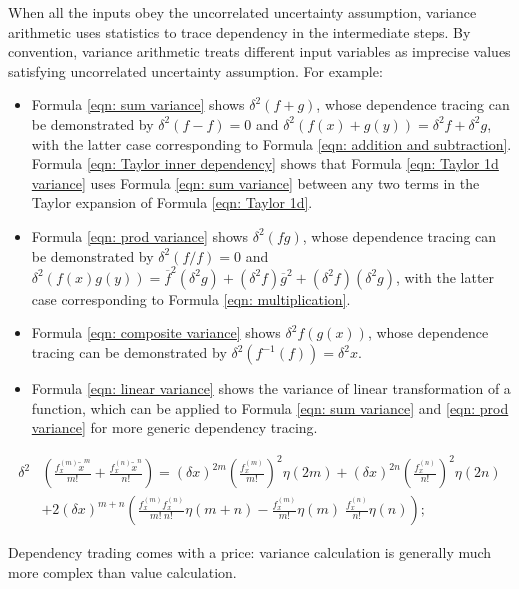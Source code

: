 \documentclass[twoside]{article}
\numberwithin{equation}{section}
\begin{document}
When all the inputs obey the uncorrelated uncertainty assumption, variance arithmetic uses statistics to trace dependency in the intermediate steps.
By convention, variance arithmetic treats different input variables as imprecise values satisfying uncorrelated uncertainty assumption.
For example:
\begin{itemize}
\item Formula \eqref{eqn: sum variance} shows $\delta^2 (f + g)$, whose dependence tracing can be demonstrated by $\delta^2 (f - f) = 0$  and $\delta^2 (f(x) + g(y)) = \delta^2 f + \delta^2 g$, with the latter case corresponding to Formula \eqref{eqn: addition and subtraction}.   Formula \eqref{eqn: Taylor inner dependency} shows that Formula \eqref{eqn: Taylor 1d variance} uses Formula \eqref{eqn: sum variance} between any two terms in the Taylor expansion of Formula \eqref{eqn: Taylor 1d}.

\item Formula \eqref{eqn: prod variance} shows  $\delta^2 (f g)$, whose dependence tracing can be demonstrated by $\delta^2 (f/f) = 0$  and $\delta^2 (f(x) g(y)) = \overline{f}^2 (\delta^2 g) + (\delta^2 f) \overline{g}^2 +  (\delta^2 f) (\delta^2 g)$, with the latter case corresponding to Formula \eqref{eqn: multiplication}.  

\item Formula \eqref{eqn: composite variance} shows  $\delta^2 f(g(x))$, whose dependence tracing can be demonstrated by $\delta^2 (f^{-1}(f)) = \delta^2 x$.  

\item Formula \eqref{eqn: linear variance} shows the variance of linear transformation of a function, which can be applied to Formula \eqref{eqn: sum variance} and \eqref{eqn: prod variance} for more generic dependency tracing.
\end{itemize}
\begin{align}
\label{eqn: Taylor inner dependency}
\delta^2 & \left( \frac{f^{(m)}_x \tilde{x}^m}{m!} + \frac{f^{(n)}_x \tilde{x}^n}{n!} \right) = 
    (\delta x)^{2m} (\frac{f^{(m)}_x }{m!})^2 \eta(2m) + (\delta x)^{2n} (\frac{f^{(n)}_x }{n!})^2 \eta(2n) \\
  &+ 2 (\delta x)^{m+n} \left( \frac{f^{(m)}_x f^{(n)}_x}{m! \;n!} \eta(m+n) 	- \frac{f^{(m)}_x}{m!} \eta(m) \;\frac{f^{(n)}_x}{n!}  \eta(n) \right);  \nonumber
\end{align}

Dependency trading comes with a price: variance calculation is generally much more complex than value calculation.
\end{document}
